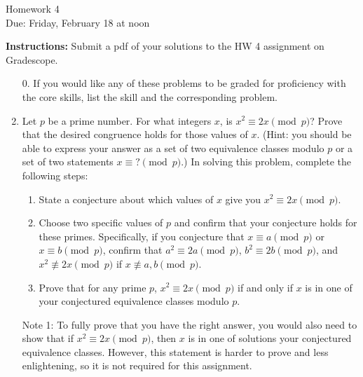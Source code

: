 \documentclass[12pt]{article}
\begin{document}
\begin{center}
{\Large Homework 4}\\
Due: Friday,  February 18 at noon\\


\end{center}
{\bf Instructions:} Submit a pdf of your solutions to the HW 4 assignment on Gradescope. 



\begin{enumerate}
\item[0.] If you would like any of these problems to be graded for proficiency with the core skills, list the skill and the corresponding problem. 
\item Let $p$ be a prime number.  For what integers $x$, is $x^2\equiv 2x\pmod{p}$? Prove that the desired congruence holds for those values of $x$.  (Hint: you should be able to express your answer as a set of two equivalence classes modulo $p$ or a set of two statements $x\equiv ?\pmod{p}$.) In solving this problem, complete the following steps:
\begin{enumerate}
\item State a conjecture about which values of $x$ give you $x^2\equiv 2x\pmod{p}$.
\item Choose two specific values of $p$ and confirm that your conjecture holds for these primes.  Specifically, if you conjecture that $x\equiv a\pmod{p}$ or $x\equiv b\pmod{p}$, confirm that $a^2\equiv 2a\pmod{p}$, $b^2\equiv2b\pmod{p}$, and $x^2\not\equiv 2x\pmod{p}$ if $x\not\equiv a,b\pmod{p}$. 
\item Prove that for any prime $p$, $x^2\equiv 2x\pmod{p}$ if and only if $x$ is in one of your conjectured equivalence classes modulo $p$. 
\end{enumerate}

Note 1: To fully prove that you have the right answer, you would also need to show that if $x^2\equiv 2x\pmod{p}$, then $x$ is in one of  solutions your conjectured equivalence classes. However, this statement is harder to prove and less enlightening, so it is not required for this assignment.


\end{enumerate}
\end{document}
